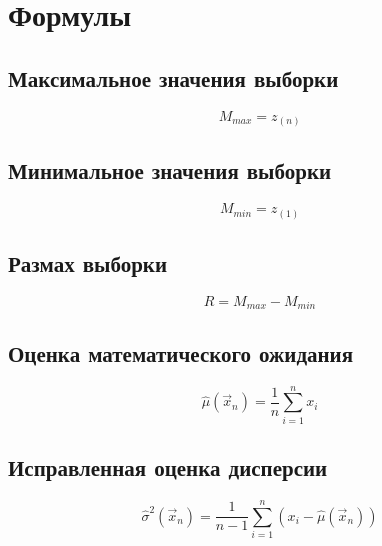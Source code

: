 \chapter{Формулы}

\section{Максимальное значения выборки}
\begin{equation}
M_{max} = z_{(n)}
\end{equation}

\section{Минимальное значения выборки}
\begin{equation}
M_{min} = z_{(1)}
\end{equation}

\section{Размах выборки}
\begin{equation}
R = M_{max} - M_{min}
\end{equation}

\section{Оценка математического ожидания }
\begin{equation}
\hat{\mu}(\vec{x}_n) = \frac{1}{n}\sum_{i=1}^n x_i
\end{equation}

\section{Исправленная оценка дисперсии}
\begin{equation}
\hat{\sigma}^2(\vec{x}_n) = \frac{1}{n - 1}\sum_{i=1}^n (x_i - \hat{\mu}(\vec{x}_n))
\end{equation}